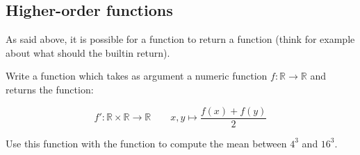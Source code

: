 \documentclass{../../../tp}
\begin{document}
\subsection{Higher-order functions}

As said above, it is possible for a function to return a function (think for example about what should the  builtin return). 

\begin{instruction}
	Write a function  which takes as argument a numeric function $f: \mathbb{R} \rightarrow \mathbb{R}$ and returns the function: 
	
	$$ f': \mathbb{R} \times \mathbb{R} \rightarrow \mathbb{R} \qquad  x,y  \mapsto  \frac{f(x) + f(y)}{2}$$
	
	
	Use this function with the  function to compute the mean between  $4^3$ and $16^3$.
\end{instruction}
\end{document}
